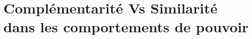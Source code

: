 \documentclass[a4paper, 11pt]{book}
\begin{document}
	

%	
%	
%	
\chapter{Complémentarité Vs Similarité dans les comportements de pouvoir}

	\minitoc
	
	\label{chap:dec}
	
	
\end{document}
